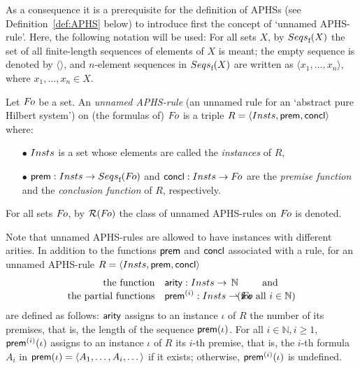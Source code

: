 \documentclass[envcountsame,runningheads]{llncs}
\newcommand{\pairlft}{{\langle}}
\newcommand{\pairrgt}{{\rangle}}
\newcommand{\pairsep}{{,\,}\nix}
\newcommand{\pairstr}[1]{\pairlft#1\pairrgt}
\newcommand{\pair}[2]{\pairstr{#1\pairsep#2}}
\newcommand{\triple}[2]{\pair{#1\pairsep#2}}
\newcommand{\seqlft}{{\langle}}
\newcommand{\seqrgt}{{\rangle}}
\newcommand{\seq}[1]{\seqlft#1\seqrgt}
\newcommand{\nat}{\mathbb N}
\newcommand{\sfunin}{{:}}
\newcommand{\funin}{\mathrel{\sfunin}}
\newcommand{\finseqs}{\funap{{\mit Seqs}_{\text{f}}}}
\newcommand{\nix}{}
\newcommand{\funap}[2]{#1(#2)}
\newcommand{\APHS}{A\hspace*{-0.3pt}P\hspace*{-0.6pt}H\hspace*{-0.4pt}S}
\newcommand{\insts}{{\mit Insts}}
\newcommand{\forms}{{\mit F\hspace*{-1.1pt}o}}
\newcommand{\ainst}{\iota}
\newcommand{\aunnamedRule}{R}
\newcommand{\sAPHSrules}{\mcl{R}}
\newcommand{\APHSrules}{\funap{\sAPHSrules}}
\newcommand{\sprem}{{\sf prem}}
\newcommand{\sconcl}{{\sf concl}}
\newcommand{\prem}{\funap{\sprem}}
\newcommand{\sarity}{{\sf arity}}
\newcommand{\arity}{\funap{\sarity}}
\newcommand{\spremi}[1]{{\sprem^{(#1)}}}
\newcommand{\premi}[1]{\funap{\spremi{#1}}}
\newcommand{\mcl}{\mathcal}
\newcommand{\aform}{A}
\begin{document}
As a consequence it is a prerequisite for the definition of \APHS{s} 
(see Definition~\ref{def:APHS} below) to introduce first the 
concept of `unnamed \APHS-rule'.
Here, the following notation will be used: 
For all sets $X$, by $\finseqs{X}$ the set of all finite-length sequences
of elements of $X$ is meant; 
the empty sequence is denoted by $\seq{}$, and $n$-element sequences 
in $\finseqs{X}$ are written as $\seq{x_1,\ldots,x_n}$,
where $x_1,\ldots,x_n\in X$. 


\begin{definition}\normalfont 
  \label{def:APHS:rule}
Let $\forms$ be a set.
An {\emph{unnamed \APHS-rule}}
     (an unnamed rule for an `abstract pure Hilbert system')
  on (the formulas of) $\forms$ is a triple 
  $ \aunnamedRule = \triple{\insts}{\sprem}{\sconcl}$ 
  where:
\begin{itemize}
\item[$\bullet$]  
      $\insts$ is a set whose elements are called
      the {\em instances\/} of $\aunnamedRule$,
\vspace{0.75ex}
\item[$\bullet$] 
      $\sprem \funin \insts \to \finseqs{\forms}$ and
      $\sconcl \funin \insts \to \forms$
      are the {\em premise function\/}
      and the {\em conclusion function\/} of $\aunnamedRule$, respectively.
\end{itemize}
For all sets $\forms$, by $\APHSrules{\forms}$ 
  the class of unnamed \APHS-rules on $\forms$ is denoted.
\end{definition}

Note that unnamed \APHS-rules are allowed to have instances with different
arities. 
In addition to the functions $\sprem$ and $\sconcl$ 
associated with a rule,
for an unnamed \APHS-rule $\aunnamedRule = \triple{\insts}{\sprem}{\sconcl}$
\begin{align*}
\text{the function} \quad
      & \sarity : \insts \rightarrow \,\nat \;\,
      & & \text{and}
                                                                 \\[-0.75ex]
   \text{the partial functions} \quad
      & \spremi{i} : \insts \rightharpoonup \forms 
      & & \hspace*{-6ex}
        \text{(for all $i\in \nat $)}  
\end{align*}
are defined as follows:
$\sarity$ assigns to an instance $\ainst$ of $\aunnamedRule$ the number of
its premises, that is, the length of the sequence $\prem{\ainst}$.
For all $i\in\nat, i\ge 1$,
$\premi{i}{\ainst}$ assigns to an instance $\ainst$ of $\aunnamedRule$
its $i$-th premise, that is, the $i$-th formula $\aform_i$ in
$ \prem{\ainst} = \seq{\aform_1,\ldots,\aform_i,\ldots} $ if it exists;
otherwise, $\premi{i}{\ainst}$ is undefined. 
\begin{Figure}[t]
\begin{center}
\scalebox{0.5}{}
\end{center}
\caption{\label{fig:inst:APHS-Rule}Visualisation as hypergraph hyperedge of
           an instance $\ainst$ of an \APHS-rule
           with arity $\arity{\ainst} = n$.}
\end{Figure}
\end{document}
